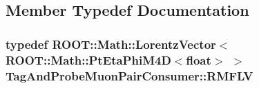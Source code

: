 \subsection{Member Typedef Documentation}
\hypertarget{classTagAndProbeMuonPairConsumer_aab60ab5bd356a7bcf703c77348363bdc}{
\subsubsection[{RMFLV}]{\setlength{\rightskip}{0pt plus 5cm}typedef ROOT::Math::LorentzVector$<$ROOT::Math::PtEtaPhiM4D$<$float$>$ $>$ {\bf TagAndProbeMuonPairConsumer::RMFLV}}}
\label{classTagAndProbeMuonPairConsumer_aab60ab5bd356a7bcf703c77348363bdc}


